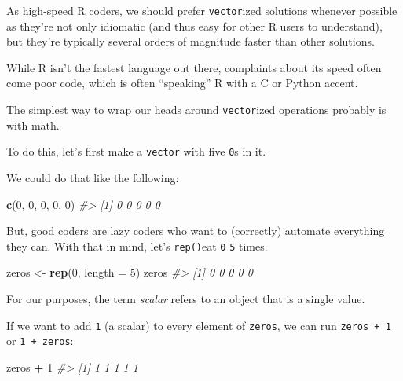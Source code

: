 \documentclass[
]{report}
\newenvironment{Shaded}{\begin{snugshade}}{\end{snugshade}}
\newcommand{\CommentTok}[1]{\textcolor[rgb]{0.56,0.35,0.01}{\textit{#1}}}
\newcommand{\DataTypeTok}[1]{\textcolor[rgb]{0.13,0.29,0.53}{#1}}
\newcommand{\DecValTok}[1]{\textcolor[rgb]{0.00,0.00,0.81}{#1}}
\newcommand{\KeywordTok}[1]{\textcolor[rgb]{0.13,0.29,0.53}{\textbf{#1}}}
\newcommand{\NormalTok}[1]{#1}
\newcommand{\OperatorTok}[1]{\textcolor[rgb]{0.81,0.36,0.00}{\textbf{#1}}}
\newcommand{\StringTok}[1]{\textcolor[rgb]{0.31,0.60,0.02}{#1}}
\begin{document}
As high-speed R coders, we should prefer \texttt{vector}ized solutions whenever possible as they're not only idiomatic (and thus easy for other R users to understand), but they're typically several orders of magnitude faster than other solutions.

While R isn't the fastest language out there, complaints about its speed often come poor code, which is often ``speaking'' R with a C or Python accent.

The simplest way to wrap our heads around \texttt{vector}ized operations probably is with math.

To do this, let's first make a \texttt{vector} with five \texttt{0}s in it.

We could do that like the following:

\begin{Shaded}
\begin{Highlighting}[]
\KeywordTok{c}\NormalTok{(}\DecValTok{0}\NormalTok{, }\DecValTok{0}\NormalTok{, }\DecValTok{0}\NormalTok{, }\DecValTok{0}\NormalTok{, }\DecValTok{0}\NormalTok{)}
\CommentTok{\#\textgreater{} [1] 0 0 0 0 0}
\end{Highlighting}
\end{Shaded}

But, good coders are lazy coders who want to (correctly) automate everything they can. With that in mind, let's \texttt{rep()}eat \texttt{0} \texttt{5} times.

\begin{Shaded}
\begin{Highlighting}[]
\NormalTok{zeros \textless{}{-}}\StringTok{ }\KeywordTok{rep}\NormalTok{(}\DecValTok{0}\NormalTok{, }\DataTypeTok{length =} \DecValTok{5}\NormalTok{)}
\NormalTok{zeros}
\CommentTok{\#\textgreater{} [1] 0 0 0 0 0}
\end{Highlighting}
\end{Shaded}

For our purposes, the term \emph{scalar} refers to an object that is a single value.

If we want to add \texttt{1} (a scalar) to every element of \texttt{zeros}, we can run \texttt{zeros\ +\ 1} or \texttt{1\ +\ zeros}:

\begin{Shaded}
\begin{Highlighting}[]
\NormalTok{zeros }\OperatorTok{+}\StringTok{ }\DecValTok{1}
\CommentTok{\#\textgreater{} [1] 1 1 1 1 1}
\end{Highlighting}
\end{Shaded}
\end{document}
